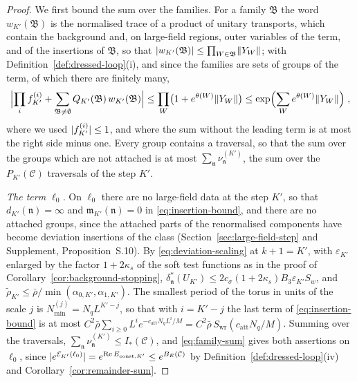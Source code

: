 \documentclass[11pt]{preprint}
\DeclarePairedDelimiter{\abs}{\lvert}{\rvert}
\DeclarePairedDelimiter{\norm}{\lVert}{\rVert}
\numberwithin{equation}{section}
\theoremstyle{definition}
\theoremstyle{remark}
\theoremstyle{plain}
\begin{document}
\begin{proof}
We first bound the sum over the families. For a family $\mathfrak B$ the word $w_{K'}(\mathfrak B)$ is the normalised trace of a product of unitary transports, which contain the background and, on large-field regions, outer variables of the term, and of the insertions of $\mathfrak B$, so that $\abs{w_{K'}(\mathfrak B)} \leq \prod_{W \in \mathfrak B}\norm{Y_W}$; with Definition~\ref{def:dressed-loop}(i), and since the families are sets of groups of the term, of which there are finitely many,
\begin{equation}\label{eq:family-sum}
    \Bigl\lvert\prod_if^{(i)}_{K'} + \sum_{\mathfrak B \neq \emptyset}Q_{K'}(\mathfrak B)\,w_{K'}(\mathfrak B)\Bigr\rvert \leq \prod_W\bigl(1 + e^{\theta(W)}\norm{Y_W}\bigr) \leq \exp\Bigl(\sum_We^{\theta(W)}\norm{Y_W}\Bigr)\;,
\end{equation}
where we used $\abs{f^{(i)}_{K'}} \leq 1$, and where the sum without the leading term is at most the right side minus one. Every group contains a traversal, so that the sum over the groups which are not attached is at most $\sum_{\mathfrak n}\nu^{(K')}_{\mathfrak n}$, the sum over the $P_{K'}(\mathcal C)$ traversals of the step $K'$.

\emph{The term $\ell_0$.} On $\ell_0$ there are no large-field data at the step $K'$, so that $d_{K'}(\mathfrak n) = \infty$ and $\mathfrak m_{K'}(\mathfrak n) = 0$ in \eqref{eq:insertion-bound}, and there are no attached groups, since the attached parts of the renormalised components have become deviation insertions of the class (Section~\ref{sec:large-field-step} and Supplement, Proposition~S.10). By \eqref{eq:deviation-scaling} at $k + 1 = K'$, with $\varepsilon_{K'}$ enlarged by the factor $1 + 2\kappa_s$ of the soft test functions as in the proof of Corollary~\ref{cor:background-stopping}, $\delta^*_{\mathfrak n}(U_{K'}) \leq 2c_\sigma(1 + 2\kappa_s)B_3\varepsilon_{K'}S_w$, and $\tilde\rho_{K'} \leq \bar\rho/\min(\alpha_{0,K'}, \alpha_{1,K'})$. The smallest period of the torus in units of the scale $j$ is $N^{(j)}_{\min} = N_qL^{K'-j}$, so that with $i = K' - j$ the last term of \eqref{eq:insertion-bound} is at most $C^2\bar\rho\sum_{i \geq 0}L^ie^{-c_{\mathrm{att}}N_qL^i/M} = C^2\bar\rho\,S_{\mathrm{wr}}(c_{\mathrm{att}}N_q/M)$. Summing over the traversals, $\sum_{\mathfrak n}\nu^{(K')}_{\mathfrak n} \leq I_*(\mathcal C)$, and \eqref{eq:family-sum} gives both assertions on $\ell_0$, since $\abs{e^{\mathcal E_{K'}(\ell_0)}} = e^{\operatorname{Re}E_{\mathrm{const},K'}} \leq e^{B_E(\mathcal C)}$ by Definition~\ref{def:dressed-loop}(iv) and Corollary~\ref{cor:remainder-sum}.


\end{proof}
\end{document}

